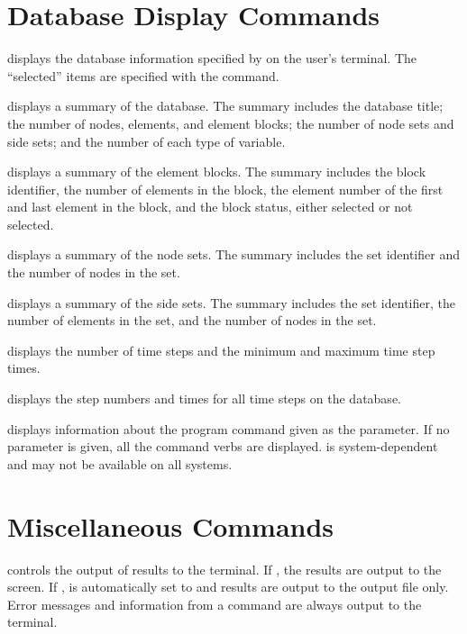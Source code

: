 \section{Database Display Commands}
\label{cmd:display}

 {
 displays the database information specified by 
on the user's terminal. The ``selected'' items are specified with the
 command.

 {
displays a summary of the database. The summary includes the database
title; the number of nodes, elements, and element blocks; the number of
node sets and side sets; and the number of each type of
variable.
}

 {
displays a summary of the element blocks. The summary includes
the block identifier, the number of elements in the block, the element
number of the first and last element in the block, and the block status,
either selected or not selected.
}

 {
displays a summary of the node sets. The summary
includes the set identifier and the number of nodes in the set.
}

 {
displays a summary of the side sets. The summary
includes the set identifier, the number of elements in the set, and the
number of nodes in the set.
}

 {
displays the number of time steps and the minimum and maximum time step
times.
}

 {
displays the step numbers and times for all time steps on the database.
}
}

\filbreak
{} {
 displays information about the program command given as the
parameter. If no parameter is given, all the command verbs are
displayed.  is system-dependent and may not be available on
all systems.
}
\filbreak
\section{Miscellaneous Commands}\label{sec:misc}

 {
 controls the output of results to the terminal.  If ,
the results are output to the screen. If ,  is
automatically set to  and results are output to the output file
only.  Error messages and information from a  command are
always output to the terminal.
}

